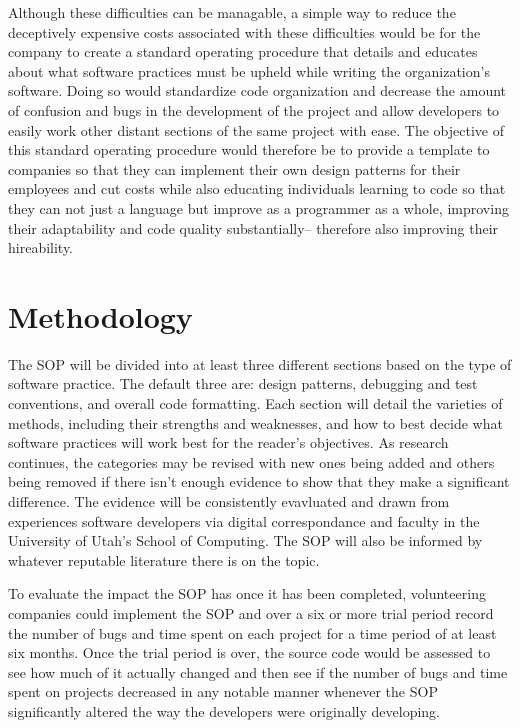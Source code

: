\documentclass[12pt, letterpaper]{article}
\begin{document}
  Although these difficulties can be managable, a simple way to reduce the deceptively expensive costs associated with these difficulties would be for the company to create a standard operating
  procedure that details and educates about what software practices must be upheld while writing the organization's software. Doing so would standardize code organization and decrease the amount of
  confusion and bugs in the development of the project and allow developers to easily work other distant sections of the same project with ease. The objective of this standard operating procedure
  would therefore be to provide a template to companies so that they can implement their own design patterns for their employees and cut costs while also educating individuals learning to code
  so that they can not just a language but improve as a programmer as a whole, improving their adaptability and code quality substantially-- therefore also improving their hireability.
\section{Methodology}
  The SOP will be divided into at least three different sections based on the type of software practice. The default three are: design patterns, debugging and test conventions, and overall code formatting.
  Each section will detail the varieties of methods, including their strengths and weaknesses, and how to best decide what software practices will work best for the reader's objectives. As research continues,
  the categories may be revised with new ones being added and others being removed if there isn't enough evidence to show that they make a significant difference. The evidence will be consistently evavluated and drawn from experiences software developers via digital correspondance and faculty in the University of Utah's School of Computing. The SOP will also
  be informed by whatever reputable literature there is on the topic.

  To evaluate the impact the SOP has once it has been completed, volunteering companies could implement the SOP and over a six or more trial period record the number of bugs and time spent on each project for a time period of
  at least six months. Once the trial period is over, the source code would be assessed to see how much of it actually changed and then see if the number of bugs and time spent on projects decreased in any notable manner whenever
  the SOP significantly altered the way the developers were originally developing.
\end{document}
